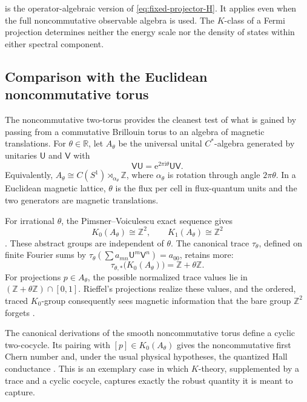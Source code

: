 \documentclass[11pt]{article}
\theoremstyle{definition}
\theoremstyle{remark}
\newcommand{\RR}{\mathbb R}
\newcommand{\ZZ}{\mathbb Z}
\newcommand{\ii}{\mathrm i}
\newcommand{\e}{\mathrm e}
\begin{document}
 is the operator-algebraic version of
\eqref{eq:fixed-projector-H}.  It applies even when the full noncommutative
observable algebra is used.  The \(K\)-class of a Fermi projection determines
neither the energy scale nor the density of states within either spectral
component.

\subsection{Comparison with the Euclidean noncommutative torus}

The noncommutative two-torus provides the cleanest test of what is gained by
passing from a commutative Brillouin torus to an algebra of magnetic
translations.  For \(\theta\in\RR\), let \(A_\theta\) be the universal unital
\(C^*\)-algebra generated by unitaries \(\mathsf U\) and \(\mathsf V\) with
\[
                  \mathsf V\mathsf U
                    =\e^{2\pi\ii\theta}\mathsf U\mathsf V .
\]
Equivalently,
\(A_\theta\cong C(S^1)\rtimes_{\alpha_\theta}\ZZ\), where
\(\alpha_\theta\) is rotation through angle \(2\pi\theta\).  In a Euclidean
magnetic lattice, \(\theta\) is the flux per cell in flux-quantum units and
the two generators are magnetic translations.

For irrational \(\theta\), the Pimsner--Voiculescu exact sequence gives
\[
                    K_0(A_\theta)\cong\ZZ^2,
              \qquad K_1(A_\theta)\cong\ZZ^2
\]
\cite{PimsnerVoiculescu1980}.  These abstract groups are independent of
\(\theta\).  The canonical trace \(\tau_\theta\), defined on finite Fourier
sums by
\(\tau_\theta(\sum a_{mn}\mathsf U^m\mathsf V^n)=a_{00}\), retains more:
\[
             \tau_{\theta,*}\bigl(K_0(A_\theta)\bigr)
                    =\ZZ+\theta\ZZ .
\]
For projections \(p\in A_\theta\), the possible normalized trace values lie in
\((\ZZ+\theta\ZZ)\cap[0,1]\).  Rieffel's projections realize these values,
and the ordered, traced \(K_0\)-group consequently sees magnetic information
that the bare group \(\ZZ^2\) forgets \cite{RieffelRotation1981}.

The canonical derivations of the smooth noncommutative torus define a cyclic
two-cocycle.  Its pairing with \([p]\in K_0(A_\theta)\) gives the noncommutative
first Chern number and, under the usual physical hypotheses, the quantized
Hall conductance
\cite{ConnesNCG,BellissardVanElstSchulzBaldes}.  This is an exemplary case in
which \(K\)-theory, supplemented by a trace and a cyclic cocycle, captures
exactly the robust quantity it is meant to capture.
\end{document}
